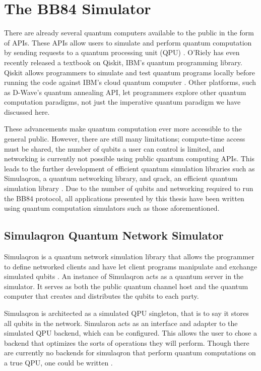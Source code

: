 \chapter{The BB84 Simulator}
\label{chap:implementation}
There are already several quantum computers available to the public in the form of APIs.
These APIs allow users to simulate and perform quantum computation by sending requests to a quantum processing unit (QPU) \cite{qiskit}. 
O'Riely has even recently released a textbook on Qiskit, IBM's quantum programming library\cite{pqc}.
Qiskit allows programmers to simulate and test quantum programs locally before running the code against IBM's cloud quantum computer \cite{qiskit}. 
Other platforms, such as D-Wave's quantum annealing API, let programmers explore other quantum computation paradigms, not just the imperative quantum paradigm we have discussed here. 

These advancements make quantum computation ever more accessible to the general public.
However, there are still many limitations; compute-time access must be shared, the number of qubits a user can control is limited, and networking is currently not possible using public quantum computing APIs.
This leads to the further development of efficient quantum simulation libraries such as Simulaqron, a quantum networking library, and qrack, an efficient quantum simulation library \cite{qrack}.
Due to the number of qubits and networking required to run the BB84 protocol, all applications presented by this thesis have been written using quantum computation simulators such as those aforementioned. 


\section{Simulaqron Quantum Network Simulator}
Simulaqron is a quantum network simulation library that allows the programmer to define networked clients and have let client programs manipulate and exchange simulated qubits \cite{simulaqron}.
An instance of Simulaqron acts as a quantum server in the simulator.
It serves as both the public quantum channel host and the quantum computer that creates and distributes the qubits to each party.

Simulaqron is architected as a simulated QPU singleton, that is to say it stores all qubits in the network.
Simularon acts as an interface and adapter to the simulated QPU backend, which can be configured.
This allows the user to chose a backend that optimizes the sorts of operations they will perform.
Though there are currently no backends for simulaqron that perform quantum computations on a true QPU, one could be written \cite{simulaqron}.

